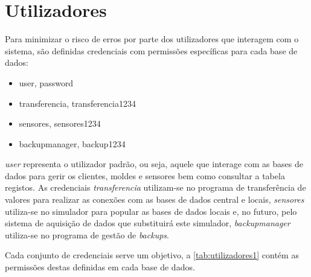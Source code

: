 \documentclass[11pt,twoside,a4paper]{report}
\begin{document}
\section{Utilizadores}
Para minimizar o risco de erros por parte dos utilizadores que interagem com o sistema, são definidas credenciais com permissões específicas para cada base de dados:
\begin{itemize}[noitemsep]
	\item user, password
	\item transferencia, transferencia1234
	\item sensores, sensores1234
	\item backupmanager, backup1234
\end{itemize}
\textit{user} representa o utilizador padrão, ou seja, aquele que interage com as bases de dados para gerir os clientes, moldes e sensores bem como consultar a tabela registos. As credenciais \textit{transferencia} utilizam-se no programa de transferência de valores para realizar as conexões com as bases de dados central e locais, \textit{sensores} utiliza-se no simulador para popular as bases de dados locais e, no futuro, pelo sistema de aquisição de dados que substituirá este simulador, \textit{backupmanager} utiliza-se no programa de gestão de \textit{backups}.\par 
Cada conjunto de credenciais serve um objetivo, a \autoref{tab:utilizadores1} contém as permissões destas definidas em cada base de dados.\par 
\end{document}
